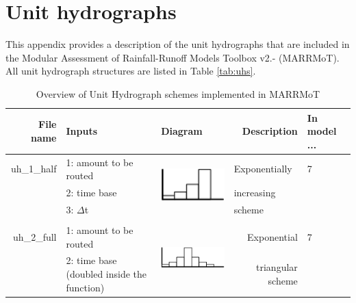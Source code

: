 \chapter{Unit hydrographs}
This appendix provides a description of the unit hydrographs that are included in the Modular Assessment of Rainfall-Runoff Models Toolbox v2.- (MARRMoT).
All unit hydrograph structures are listed in Table \ref{tab:uhs}.




\begin{table}[ht!]
  \centering
  \caption{Overview of Unit Hydrograph schemes implemented in MARRMoT}
\hspace*{-5em}    
\begin{tabular}{rp{10.57em}lrl}
    \toprule
    \multicolumn{1}{p{6.215em}}{\textbf{File name}} & \textbf{Inputs} & \multicolumn{1}{p{8.645em}}{\textbf{Diagram}} & \multicolumn{1}{p{8.43em}}{\textbf{Description }} & \multicolumn{1}{p{6.07em}}{\textbf{In model ...}} \\
    \midrule
    \multicolumn{1}{p{6.215em}}{uh\_1\_half} & 1: amount to be routed & \multirow{3}[1]{*}{ \begin{minipage}{3cm} \includegraphics[height=1.3cm]{./AppC_graphics/uh1} \end{minipage}} & \multicolumn{1}{l}{Exponentially} & 7 \\
          & 2: time base &       & \multicolumn{1}{l}{increasing} &  \\
          & 3: $\Delta$t &       & \multicolumn{1}{l}{scheme} &  \\
          & \multicolumn{1}{l}{} &       &       &  \\
    \multicolumn{1}{p{6.215em}}{uh\_2\_full} & 1: amount to be routed & \multirow{3}[0]{*}{ \begin{minipage}{3cm} \includegraphics[height=1.3cm]{./AppC_graphics/uh2} \end{minipage} } & \multicolumn{1}{p{8.43em}}{Exponential} & 7 \\
          & 2: time base (doubled inside the function) &       & \multicolumn{1}{p{8.43em}}{triangular scheme} &  \\

\end{tabular}
\end{table}
